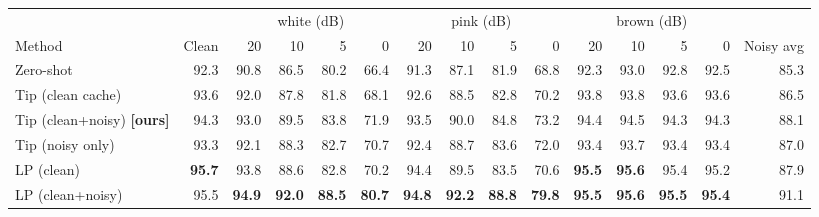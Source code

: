 \begin{tabular}{lrrrrrrrrrrrrrr}
\toprule
 & & \multicolumn{4}{c}{white (dB)} & \multicolumn{4}{c}{pink (dB)} & \multicolumn{4}{c}{brown (dB)} & \\
Method & Clean & 20 & 10 & 5 & 0 & 20 & 10 & 5 & 0 & 20 & 10 & 5 & 0 & Noisy avg \\
\midrule
Zero-shot & 92.3 & 90.8 & 86.5 & 80.2 & 66.4 & 91.3 & 87.1 & 81.9 & 68.8 & 92.3 & 93.0 & 92.8 & 92.5 & 85.3 \\
Tip (clean cache) & 93.6 & 92.0 & 87.8 & 81.8 & 68.1 & 92.6 & 88.5 & 82.8 & 70.2 & 93.8 & 93.8 & 93.6 & 93.6 & 86.5 \\
Tip (clean+noisy) \textbf{[ours]} & 94.3 & 93.0 & 89.5 & 83.8 & 71.9 & 93.5 & 90.0 & 84.8 & 73.2 & 94.4 & 94.5 & 94.3 & 94.3 & 88.1 \\
Tip (noisy only) & 93.3 & 92.1 & 88.3 & 82.7 & 70.7 & 92.4 & 88.7 & 83.6 & 72.0 & 93.4 & 93.7 & 93.4 & 93.4 & 87.0 \\
LP (clean) & \textbf{95.7} & 93.8 & 88.6 & 82.8 & 70.2 & 94.4 & 89.5 & 83.5 & 70.6 & \textbf{95.5} & \textbf{95.6} & 95.4 & 95.2 & 87.9 \\
LP (clean+noisy) & 95.5 & \textbf{94.9} & \textbf{92.0} & \textbf{88.5} & \textbf{80.7} & \textbf{94.8} & \textbf{92.2} & \textbf{88.8} & \textbf{79.8} & \textbf{95.5} & \textbf{95.6} & \textbf{95.5} & \textbf{95.4} & 91.1 \\
\bottomrule
\end{tabular}